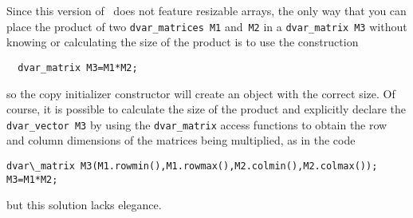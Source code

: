 \documentclass{admbmanual}
\begin{document}
%

Since this version of \scAD\ does not feature resizable arrays, the only way
that you can place the product of two \texttt{dvar\_matrices}~\texttt{M1}
and~\texttt{M2} in a \texttt{dvar\_matrix}~\texttt{M3} without knowing or
calculating the size of the product is to use the construction
\begin{lstlisting}
  dvar_matrix M3=M1*M2;
\end{lstlisting}
so the copy initializer constructor will create an object with the correct size.
Of course, it is possible to calculate the size of the product and explicitly
declare the \texttt{dvar\_vector~M3} by using the \texttt{dvar\_matrix} access
functions to obtain the row and column dimensions of the matrices being
multiplied, as in the code
\begin{lstlisting}
dvar\_matrix M3(M1.rowmin(),M1.rowmax(),M2.colmin(),M2.colmax());
M3=M1*M2;
\end{lstlisting}
but this solution lacks elegance.
\end{document}
